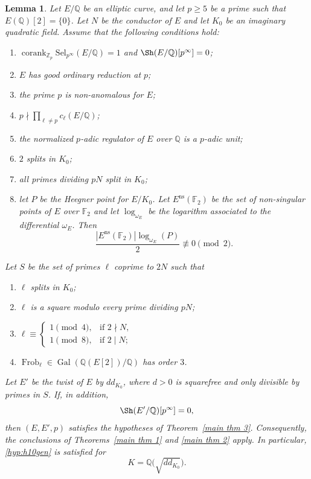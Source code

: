 \documentclass[12pt]{amsart}
\newtheorem{lemma}[theorem]{Lemma}
\newcommand{\Z}{\mathbb{Z}}
\newcommand{\Q}{\mathbb{Q}}
\newcommand{\F}{\mathbb{F}}
\newcommand{\Sel}{\mathrm{Sel}}
\newcommand{\op}[1]{\operatorname{#1}}
\numberwithin{equation}{section}
\begin{document}
\begin{lemma}\label{lem:density-kriz-li}
Let $E/\Q$ be an elliptic curve, and let $p\geq 5$ be a prime such that
$E(\Q)[2]=\{0\}$. Let $N$ be the conductor of $E$ and let $K_0$ be
an imaginary quadratic field. Assume that the following conditions hold:
\begin{enumerate}
    \item $\op{corank}_{\Z_p}\Sel_{p^\infty}(E/\Q)=1$ and $\Sh(E/\Q)[p^\infty]=0$;
    \item $E$ has good ordinary reduction at $p$;
    \item the prime $p$ is non-anomalous for $E$;
    \item $p\nmid\prod_{\ell\neq p}c_\ell(E/\Q)$;
    \item the normalized $p$-adic regulator of $E$ over $\Q$ is a
    $p$-adic unit;
    \item $2$ splits in $K_0$;
    \item all primes dividing $pN$ split in $K_0$;
    \item let $P$ be the Heegner point for $E/K_0$. Let
    $E^{\mathrm{ns}}(\F_2)$ be the set of non-singular points of $E$
    over $\F_2$ and let $\log_{\omega_E}$ be the logarithm associated
    to the differential $\omega_E$. Then
    \[
        \frac{|E^{\mathrm{ns}}(\F_2)|\log_{\omega_E}(P)}{2}
        \not\equiv 0\pmod 2.
    \]
\end{enumerate}

Let $S$ be the set of primes $\ell$ coprime to $2N$ such that
\begin{enumerate}
    \item $\ell$ splits in $K_0$;
    \item $\ell$ is a square modulo every prime dividing $pN$;
    \item $\ell\equiv
        \begin{cases}
            1\pmod 4,&\text{if }2\nmid N,\\
            1\pmod 8,&\text{if }2\mid N;
        \end{cases}$
    \item $\op{Frob}_\ell\in\op{Gal}(\Q(E[2])/\Q)$ has order $3$.
\end{enumerate}
Let $E'$ be the twist of $E$ by $dd_{K_0}$, where $d>0$ is squarefree
and only divisible by primes in $S$. If, in addition,
\[
    \Sh(E'/\Q)[p^\infty]=0,
\]
then $(E,E',p)$ satisfies the hypotheses of
Theorem~\ref{main thm 3}. Consequently, the conclusions of
Theorems~\ref{main thm 1} and \ref{main thm 2} apply. In particular,
\eqref{hyp:h10gen} is satisfied for
\[
        K=\Q\bigl(\sqrt{dd_{K_0}}\bigr).
\]
\end{lemma}
\end{document}
